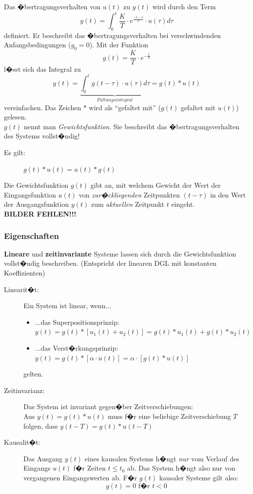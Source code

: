 \documentclass[12pt,a4paper,ngerman]{scrartcl}
\begin{document}
Das �bertragungsverhalten von $u(t)$ zu $y(t)$ wird durch den Term
\begin{equation*}
  y(t)=\int_0^t{\frac{K}{T}\cdot e^{\frac{-t-\tau}{T}}\cdot u(\tau)d\tau}
\end{equation*}
definiert. Er beschreibt das �bertragungsverhalten bei verschwindenden Anfangsbedingungen ($y_0=0$). Mit der Funktion
\begin{equation*}
  g(t)=\frac{K}{T}\cdot e^{-\frac{t}{T}}
\end{equation*}
l�sst sich das Integral zu
\begin{equation*}
  y(t)=\underbrace{\int_0^t{g(t-\tau)\cdot u(\tau)d\tau}}_{Faltungsintegral}=g(t)*u(t)
\end{equation*}
vereinfachen. Das Zeichen $*$ wird als ``gefaltet mit'' ($g(t)$ gefaltet mit $u(t)$) gelesen. \\
$g(t)$ nennt man \emph{Gewichtsfunktion}. Sie beschreibt das �bertragungsverhalten des Systems vollst�ndig!

\begin{description}
\item[Es gilt:] $g(t)*u(t)=u(t)*g(t)$
\end{description}
Die Gewichtsfunktion $g(t)$ gibt an, mit welchem Gewicht der Wert der Eingangsfunktion $u(t)$ von \emph{zur�ckliegenden} Zeitpunkten $(t-\tau)$ in den Wert der Ausgangsfunktion $y(t)$ zum \emph{aktuellen} Zeitpunkt $t$ eingeht.\\
\textbf{BILDER FEHLEN!!!}

\subsubsection{Eigenschaften}
\textbf{Lineare} und \textbf{zeitinvariante} Systeme lassen sich durch die Gewichtsfunktion vollst�ndig beschreiben. (Entspricht der linearen DGL mit konstanten Koeffizienten)
\begin{description}
\item[Linearit�t:] Ein System ist linear, wenn...
  \begin{itemize}
  \item ...das Superpositionsprinzip: $y(t)=g(t)*[u_1(t)+u_2(t)]=g(t)*u_1(t)+ g(t)*u_2(t)$
  \item ...das Verst�rkungsprinzip: $y(t)=g(t)*[\alpha \cdot u(t)]= \alpha \cdot[g(t)*u(t)]$
  \end{itemize}
gelten.
\item[Zeitinvarianz:] Das System ist invariant gegen�ber Zeitverschiebungen: \\
Aus $y(t)=g(t)*u(t)$ muss f�r eine beliebige Zeitverschiebung $T$ folgen, dass $y(t-T)=g(t)*u(t-T)$
\item[Kausalit�t:] Das Ausgang $y(t)$ eines kausalen Systems h�ngt \emph{nur} vom Verlauf des Eingangs $u(t)$ f�r Zeiten $t\le t_0$ ab. Das System h�ngt also nur von vergangenen Eingangswerten ab. F�r $g(t)$ kausaler Systeme gilt also:
  \begin{equation*}
    g(t)=0 \text{ f�r } t<0
  \end{equation*}
\end{description}
\end{document}
